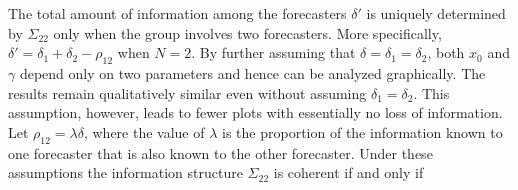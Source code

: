 \documentclass[11pt]{article}
\theoremstyle{definition}
\theoremstyle{definition}
\begin{document}
%
The total amount of information among the forecasters $\delta'$ is uniquely determined by $\Sigma_{22}$ only when the group involves two forecasters. More specifically, $\delta' = \delta_1 + \delta_2 - \rho_{12}$ when $N=2$. By further assuming that $\delta = \delta_1 = \delta_2$, both $x_0$ and $\gamma$ depend only on two parameters and hence can be analyzed graphically. The results remain qualitatively similar even without assuming $\delta_1 = \delta_2$. This assumption, however, leads to fewer plots with essentially no loss of information. Let $\rho_{12} = \lambda\delta$, where the value of $\lambda$ is the proportion  of the information known to one forecaster that is also known to the other forecaster. Under these assumptions the information structure $\Sigma_{22}$ is coherent  if and only if
\end{document}
